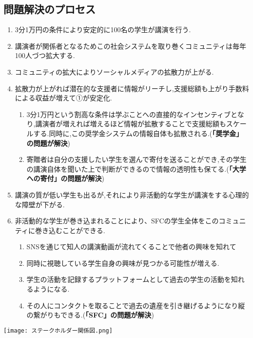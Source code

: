 \documentclass[uplatex, a4j]{jsarticle}
\begin{document}
\subsection{問題解決のプロセス}
  \begin{enumerate}
    \item 3分1万円の条件により安定的に100名の学生が講演を行う.
    \item 講演者が関係者となるためこの社会システムを取り巻くコミュニティは毎年100人づつ拡大する.
    \item コミュニティの拡大によりソーシャルメディアの拡散力が上がる.
    \item 拡散力が上がれば潜在的な支援者に情報がリーチし,支援総額も上がり手数料による収益が増えて①が安定化.
      \begin{enumerate}
        \item 3分1万円という割高な条件は学ぶことへの直接的なインセンティブとなり,講演者が増えれば増えるほど情報が拡散することで支援総額もスケールする.同時に,この奨学金システムの情報自体も拡散される.(\textbf{「奨学金」の問題が解決})
        \item 寄贈者は自分の支援したい学生を選んで寄付を送ることができ,その学生の講演自体を聞いた上で判断ができるので情報の透明性も保てる.(\textbf{「大学への寄付」の問題が解決})
      \end{enumerate}
    \item 講演の質が低い学生も出るが,それにより非活動的な学生が講演をする心理的な障壁が下がる.
    \item 非活動的な学生が巻き込まれることにより、SFCの学生全体をこのコミュニティに巻き込むことができる.
      \begin{enumerate}
        \item SNSを通じて知人の講演動画が流れてくることで他者の興味を知れて
        \item 同時に視聴している学生自身の興味が見つかる可能性が増える.
        \item 学生の活動を記録するプラットフォームとして過去の学生の活動を知れるようになる.
        \item その人にコンタクトを取ることで過去の遺産を引き継げるようになり縦の繋がりもできる.(\textbf{「SFC」の問題が解決})
      \end{enumerate}
  \end{enumerate}

  \begin{center}
    \texttt{[image: ステークホルダー関係図.png]}
  \end{center}
\end{document}
